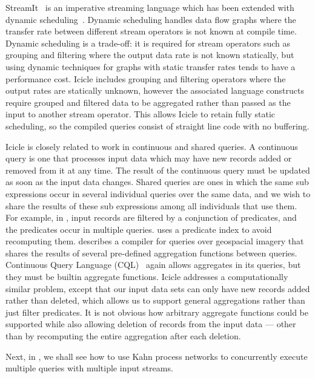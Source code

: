 StreamIt~\cite{thies2002streamit} is an imperative streaming language which has been extended with dynamic scheduling~\cite{soule2013dynamic}.
Dynamic scheduling handles data flow graphs where the transfer rate between different stream operators is not known at compile time.
Dynamic scheduling is a trade-off: it is required for stream operators such as grouping and filtering where the output data rate is not known statically, but using dynamic techniques for graphs with static transfer rates tends to have a performance cost.
Icicle includes grouping and filtering operators where the output rates are statically unknown, however the associated language constructs require grouped and filtered data to be aggregated rather than passed as the input to another stream operator.
This allows Icicle to retain fully static scheduling, so the compiled queries consist of straight line code with no buffering.

Icicle is closely related to work in continuous and shared queries.
A continuous query is one that processes input data which may have new records added or removed from it at any time.
The result of the continuous query must be updated as soon as the input data changes.
Shared queries are ones in which the same sub expressions occur in several individual queries over the same data, and we wish to share the results of these sub expressions among all individuals that use them.
For example, in \citet{munagala2007optimization}, input records are filtered by a conjunction of predicates, and the predicates occur in multiple queries.
\citet{madden2002continuously} uses a predicate index to avoid recomputing them.
\citet{andrade2003efficient} describes a compiler for queries over geospacial imagery that shares the results of several pre-defined aggregation functions between queries.
Continuous Query Language (CQL)~\cite{arasu2002abstract,stream2003stream} again allows aggregates in its queries, but they must be builtin aggregate functions.
Icicle addresses a computationally similar problem, except that our input data sets can only have new records added rather than deleted, which allows us to support general aggregations rather than just filter predicates.
It is not obvious how arbitrary aggregate functions could be supported while also allowing deletion of records from the input data --- other than by recomputing the entire aggregation after each deletion.

Next, in , we shall see how to use Kahn process networks to concurrently execute multiple queries with multiple input streams.


